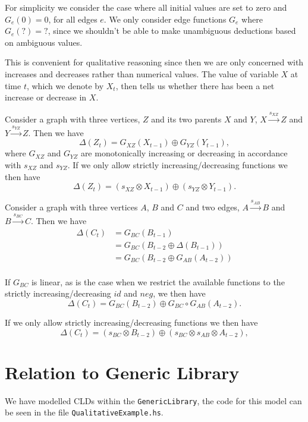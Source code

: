 \documentclass[a4paper,11pt]{article}
\begin{document}
For simplicity we consider the case where all initial values are
set to zero and $G_e(0)=0$, for all edges $e$. We only consider edge functions
$G_e$ where $G_e(?) = ?$, since we shouldn't be able to make unambiguous
deductions based on ambiguous values.
%

This is convenient for qualitative reasoning since then we are only
concerned with increases and decreases rather than numerical values.
%
The value of variable $X$ at time $t$, which we denote by $X_t$, then tells us whether there has been a net
increase or decrease in $X$.

Consider a graph with three vertices, $Z$ and its two parents
$X$ and $Y$, $X\xrightarrow{s_{XZ}} Z$ and $Y\xrightarrow{s_{YZ}} Z$.
%
Then we have
\[\Delta(Z_t) = G_{XZ}(X_{t-1}) \oplus G_{YZ}(Y_{t-1}),\]
where $G_{XZ}$ and $G_{YZ}$ are monotonically increasing or decreasing in
accordance with $s_{XZ}$ and $s_{YZ}$.
%
If we only allow strictly increasing/decreasing functions we then have
\[\Delta(Z_t) = (s_{XZ}\otimes X_{t-1})\oplus (s_{YZ}\otimes Y_{t-1}).\]

Consider a graph with three vertices $A$, $B$ and $C$ and two edges,
$A\xrightarrow{s_{AB}} B$ and $B\xrightarrow{s_{BC}} C$. Then we have
\begin{align*}
\Delta(C_t) &= G_{BC}(B_{t-1})\\
&= G_{BC}(B_{t-2} \oplus \Delta(B_{t-1}))\\
&= G_{BC}(B_{t-2}  \oplus G_{AB}(A_{t-2}))\\
\end{align*}

If $G_{BC}$ is linear, as is the case when we restrict the available functions
to the strictly increasing/decreasing $id$ and $neg$,
we then have
\[\Delta(C_t) = G_{BC}(B_{t-2})\oplus G_{BC}\circ G_{AB}(A_{t-2}).\]

If we only allow strictly increasing/decreasing functions we then have
\[\Delta(C_t) = (s_{BC}\otimes B_{t-2})\oplus (s_{BC}\otimes s_{AB}\otimes A_{t-2}),\]

\section{Relation to Generic Library}
We have modelled CLDs within the \verb|GenericLibrary|, the code for this model
can be seen in the file \verb|QualitativeExample.hs|. \\

\end{document}
